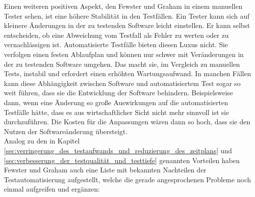 Einen weiteren positiven Aspekt, den Fewster und Graham \cite[vgl. S. 24 ff.]{fewster_software_1999} in einem manuellen Tester sehen, ist eine höhere Stabilität in den Testfällen. Ein Tester kann sich auf kleinere Änderungen in der zu testenden Software leicht einstellen. Er kann selbst entscheiden, ob eine Abweichung vom Testfall als Fehler zu werten oder zu vernachlässigen ist. Automatisierte Testfälle bieten diesen Luxus nicht. Sie verfolgen einen festen Ablaufplan und können nur schwer mit Veränderungen in der zu testenden Software umgehen. Das macht sie, im Vergleich zu manuellen Tests, instabil und erfordert einen erhöhten Wartungsaufwand. In manchen Fällen kann diese Abhängigkeit zwischen Software und automatisiertem Test sogar so weit führen, dass sie die Entwicklung der Software behindern. Beispielsweise dann, wenn eine Änderung so große Auswirkungen auf die automatisierten Testfälle hätte, dass es aus wirtschaftlicher Sicht nicht mehr sinnvoll ist sie durchzuführen. Die Kosten für die Anpassungen wären dann so hoch, dass sie den Nutzen der Softwareänderung übersteigt.\\
Analog zu den in Kapitel \ref{sec:verringerung_des_testaufwands_und_reduzierung_des_zeitplans} und \ref{sec:verbesserung_der_testqualität_und_testtiefe} genannten Vorteilen haben Fewster und Graham \cite[vgl. S. 10 ff.]{fewster_software_1999} auch eine Liste mit bekannten Nachteilen der Testautomatisierung aufgestellt, welche die gerade angesprochenen Probleme noch einmal aufgreifen und ergänzen:


